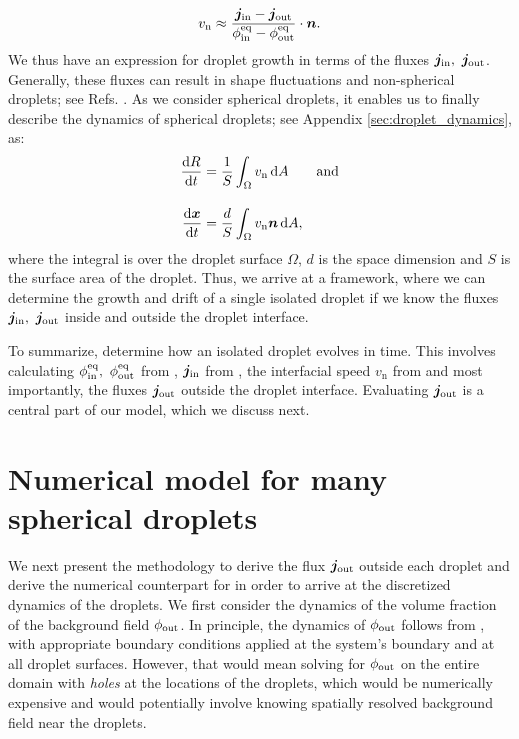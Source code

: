 \begin{equation}
    \label{eqn:InterfacialSpeed}
    v_\mathrm{n} \approx \frac{\boldsymbol{j}_\mathrm{in} - \boldsymbol{j}_\mathrm{out}}{\phi^\mathrm{eq}_\mathrm{in} - \phi^\mathrm{eq}_\mathrm{out}} \cdot \boldsymbol{n}.
\end{equation}
We thus have an expression for droplet growth in terms of the fluxes $\boldsymbol{j}_\mathrm{in},~\boldsymbol{j}_\mathrm{out}$.
Generally, these fluxes can result in shape fluctuations and non-spherical droplets; see Refs. \cite{Review2019,Zwicker_nature_2016}.
As we consider spherical droplets, it enables us to finally describe the dynamics of spherical droplets; see Appendix \ref{sec:droplet_dynamics}, as:
\begin{subequations}
\label{eqn:droplet_dynamics}
\begin{align}
	\label{eqn:DropletGrowth}
	\frac{\mathrm{d}R}{\mathrm{d}t} & = \frac{1}{S} \int_{\Omega} v_\mathrm{n} \,\mathrm{d}A
	\qquad \text{and}
    \\[10pt]
	\label{eqn:DropletDrift}
	\frac{\mathrm{d} \boldsymbol{x}}{\mathrm{d}t} &= \frac{d}{S} \int_{\Omega} v_\mathrm{n} \boldsymbol{n}\,\mathrm{d}A,
\end{align}
\end{subequations}
where the integral is over the droplet surface $\Omega$, $d$ is the space dimension and $S$ is the surface area of the droplet. 
Thus, we arrive at a framework, where we can determine the growth and drift of a single isolated droplet if we know the fluxes $\boldsymbol{j}_\mathrm{in},~\boldsymbol{j}_\mathrm{out}$ inside and outside the droplet interface.

To summarize,  determine how an isolated droplet evolves in time.
This involves calculating $\phi^\mathrm{eq}_\mathrm{in},~\phi^\mathrm{eq}_\mathrm{out}$ from , $\boldsymbol{j}_\mathrm{in}$ from , the interfacial speed $v_\mathrm{n}$ from  and most importantly, the fluxes $\boldsymbol{j}_\mathrm{out}$ outside the droplet interface.
Evaluating $\boldsymbol{j}_\mathrm{out}$ is a central part of our model, which we discuss next.


\section{Numerical model for many spherical droplets}

We next present the methodology to derive the flux $\boldsymbol{j}_\mathrm{out}$ outside each droplet and derive the numerical counterpart for  in order to arrive at the discretized dynamics of the droplets. 
We first consider the dynamics of the volume fraction of the background field $\phi_\mathrm{out}$.
In principle, the dynamics of $\phi_\mathrm{out}$ follows from , with appropriate boundary conditions applied at the system's boundary and at all droplet surfaces.
However, that would mean solving for $\phi_\mathrm{out}$ on the entire domain with \textit{holes} at the locations of the droplets, which would be numerically expensive and would potentially involve knowing spatially resolved background field near the droplets.

